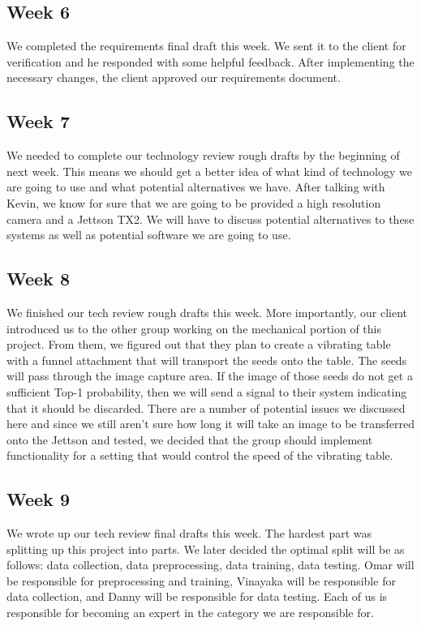 \documentclass[onecolumn, draftclsnofoot,10pt, compsoc]{IEEEtran}
\begin{document}
	\subsection{Week 6}
	We completed the requirements final draft this week. We sent it to the client for verification and he responded with some helpful feedback. After implementing the necessary changes, the client approved our requirements document.
	\subsection{Week 7}
	We needed to complete our technology review rough drafts by the beginning of next week. This means we should get a better idea of what kind of technology we are going to use and what potential alternatives we have. After talking with Kevin, we know for sure that we are going to be provided a high resolution camera and a Jettson TX2. We will have to discuss potential alternatives to these systems as well as potential software we are going to use. 
	\subsection{Week 8}
	We finished our tech review rough drafts this week. More importantly, our client introduced us to the other group working on the mechanical portion of this project. From them, we figured out that they plan to create a vibrating table with a funnel attachment that will transport the seeds onto the table. The seeds will pass through the image capture area. If the image of those seeds do not get a sufficient Top-1 probability, then we will send a signal to their system indicating that it should be discarded. There are a number of potential issues we discussed here and since we still aren't sure how long it will take an image to be transferred onto the Jettson and tested, we decided that the group should implement functionality for a setting that would control the speed of the vibrating table. 
	\subsection{Week 9}
	We wrote up our tech review final drafts this week. The hardest part was splitting up this project into parts. We later decided the optimal split will be as follows: data collection, data preprocessing, data training, data testing. Omar will be responsible for preprocessing and training, Vinayaka will be responsible for data collection, and Danny will be responsible for data testing. Each of us is responsible for becoming an expert in the category we are responsible for. 
\end{document}
